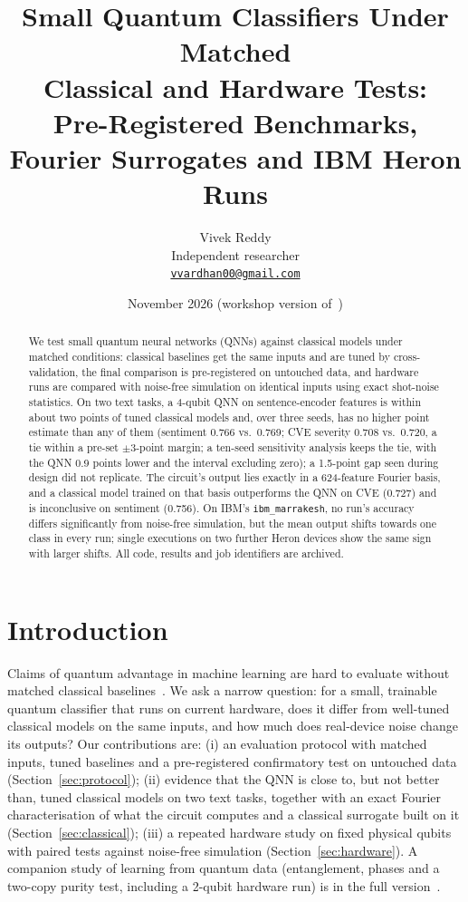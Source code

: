 \documentclass[11pt]{article}
\title{Small Quantum Classifiers Under Matched\\Classical and Hardware Tests:\\[0.3em]
\large Pre-Registered Benchmarks, Fourier Surrogates and IBM Heron Runs}
\author{Vivek Reddy\\\small Independent researcher\\\small \href{mailto:vvardhan00@gmail.com}{\texttt{vvardhan00@gmail.com}}}
\date{November 2026 \quad (workshop version of~\cite{reddy2026full})}
\begin{document}
\maketitle

\begin{abstract}
We test small quantum neural networks (QNNs) against classical models under matched conditions: classical baselines get the same inputs and are tuned by cross-validation, the final comparison is pre-registered on untouched data, and hardware runs are compared with noise-free simulation on identical inputs using exact shot-noise statistics.
On two text tasks, a 4-qubit QNN on sentence-encoder features is within about two points of tuned classical models and, over three seeds, has no higher point estimate than any of them (sentiment 0.766 vs.\ 0.769; CVE severity 0.708 vs.\ 0.720, a tie within a pre-set $\pm 3$-point margin; a ten-seed sensitivity analysis keeps the tie, with the QNN 0.9 points lower and the interval excluding zero); a 1.5-point gap seen during design did not replicate.
The circuit's output lies exactly in a 624-feature Fourier basis, and a classical model trained on that basis outperforms the QNN on CVE (0.727) and is inconclusive on sentiment (0.756).
On IBM's \texttt{ibm\_marrakesh}, no run's accuracy differs significantly from noise-free simulation, but the mean output shifts towards one class in every run; single executions on two further Heron devices show the same sign with larger shifts.
All code, results and job identifiers are archived.
\end{abstract}

\section{Introduction}
Claims of quantum advantage in machine learning are hard to evaluate without matched classical baselines~\cite{bowles2024better}. We ask a narrow question: for a small, trainable quantum classifier that runs on current hardware, does it differ from well-tuned classical models on the same inputs, and how much does real-device noise change its outputs?
Our contributions are:
(i) an evaluation protocol with matched inputs, tuned baselines and a pre-registered confirmatory test on untouched data (Section~\ref{sec:protocol});
(ii) evidence that the QNN is close to, but not better than, tuned classical models on two text tasks, together with an exact Fourier characterisation of what the circuit computes and a classical surrogate built on it (Section~\ref{sec:classical});
(iii) a repeated hardware study on fixed physical qubits with paired tests against noise-free simulation (Section~\ref{sec:hardware}).
A companion study of learning from quantum data (entanglement, phases and a two-copy purity test, including a 2-qubit hardware run) is in the full version~\cite{reddy2026full}.
\end{document}
